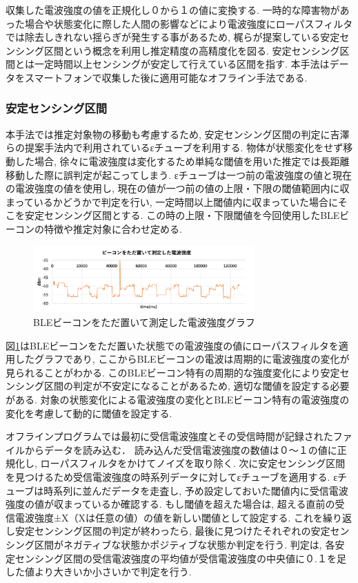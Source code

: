\documentclass[Japanese]{dicomopapers}
\begin{document}
収集した電波強度の値を正規化し０から１の値に変換する.
一時的な障害物があった場合や状態変化に際した人間の影響などにより電波強度にローパスフィルタでは除去しきれない揺らぎが発生する事があるため, 梶ら\cite{sensing-area}が提案している安定センシング区間という概念を利用し推定精度の高精度化を図る.
安定センシング区間とは一定時間以上センシングが安定して行えている区間を指す.
本手法はデータをスマートフォンで収集した後に適用可能なオフライン手法である.


\subsubsection{安定センシング区間}
本手法では推定対象物の移動も考慮するため, 安定センシング区間の判定に吉澤らの提案手法\cite{ips-chube}内で利用されているεチューブを利用する.
物体が状態変化をせず移動した場合, 徐々に電波強度は変化するため単純な閾値を用いた推定では長距離移動した際に誤判定が起こってしまう.
εチューブは一つ前の電波強度の値と現在の電波強度の値を使用し, 現在の値が一つ前の値の上限・下限の閾値範囲内に収まっているかどうかで判定を行い, 一定時間以上閾値内に収まっていた場合にそこを安定センシング区間とする.
この時の上限・下限閾値を今回使用したBLEビーコンの特徴や推定対象に合わせ定める.
\begin{figure}[ht]
    \centering
    \includegraphics[width=8.5cm]{bokoboko.png}
    \caption{BLEビーコンをただ置いて測定した電波強度グラフ}
    \label{nomal-data}
\end{figure}

図\ref{nomal-data}はBLEビーコンをただ置いた状態での電波強度の値にローパスフィルタを適用したグラフであり, ここからBLEビーコンの電波は周期的に電波強度の変化が見られることがわかる.
このBLEビーコン特有の周期的な強度変化により安定センシング区間の判定が不安定になることがあるため, 適切な閾値を設定する必要がある.
対象の状態変化による電波強度の変化とBLEビーコン特有の電波強度の変化を考慮して動的に閾値を設定する.

オフラインプログラムでは最初に受信電波強度とその受信時間が記録されたファイルからデータを読み込む．
読み込んだ受信電波強度の数値は０〜１の値に正規化し, ローパスフィルタをかけてノイズを取り除く.
次に安定センシング区間を見つけるため受信電波強度の時系列データに対してεチューブを適用する.
εチューブは時系列に並んだデータを走査し, 予め設定しておいた閾値内に受信電波強度の値が収まっているか確認する.
もし閾値を超えた場合は, 超える直前の受信電波強度±X（Xは任意の値）の値を新しい閾値として設定する.
これを繰り返し安定センシング区間の判定が終わったら, 最後に見つけたそれぞれの安定センシング区間がネガティブな状態かポジティブな状態か判定を行う.
判定は, 各安定センシング区間の受信電波強度の平均値が受信電波強度の中央値に０.１を足した値より大きいか小さいかで判定を行う.
\end{document}
